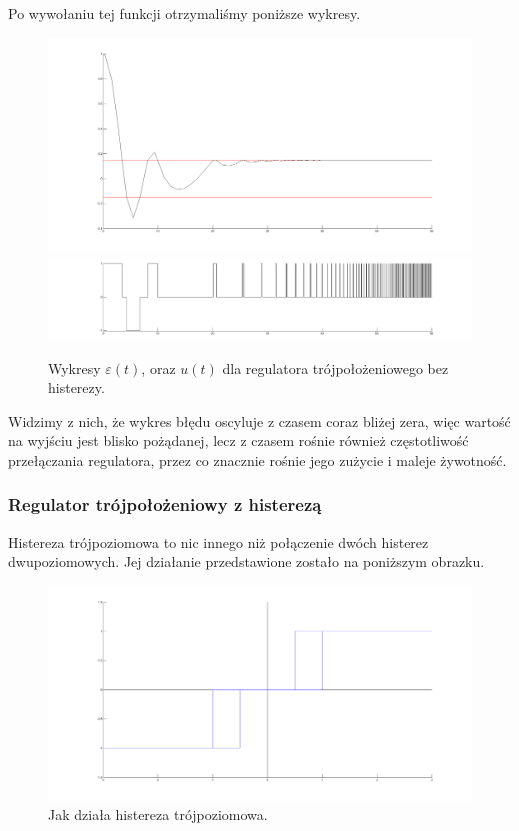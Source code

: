 \documentclass[a4paper,10pt]{article}
\begin{document}
Po wywołaniu tej funkcji otrzymaliśmy poniższe wykresy.

\begin{figure}[!h]
    \centering
	\includegraphics[width=120mm]{CW3-trojpolozeniowy-e-n015-a0.png}
	\includegraphics[width=120mm]{CW3-trojpolozeniowy-u-n015-a0.png}
	\caption{Wykresy $\varepsilon(t)$, oraz $u(t)$ dla regulatora trójpołożeniowego bez histerezy.}
    \label{fig:Rysunek}
\end{figure}

\newpage Widzimy z nich, że wykres błędu oscyluje z czasem coraz bliżej zera, więc wartość na wyjściu jest blisko pożądanej, lecz z czasem rośnie również częstotliwość przełączania regulatora, przez co znacznie rośnie jego zużycie i maleje żywotność.

\subsubsection{Regulator trójpołożeniowy z histerezą}\label{sec:r3h}%

Histereza trójpoziomowa to nic innego niż połączenie dwóch histerez dwupoziomowych. Jej działanie przedstawione zostało na poniższym obrazku.

\begin{figure}[!h]
    \centering
	\includegraphics[width=120mm]{CW3-histereza-trojpoziomowa.png}
	\caption{Jak działa histereza trójpoziomowa.}
    \label{fig:Rysunek}
\end{figure}
\end{document}
